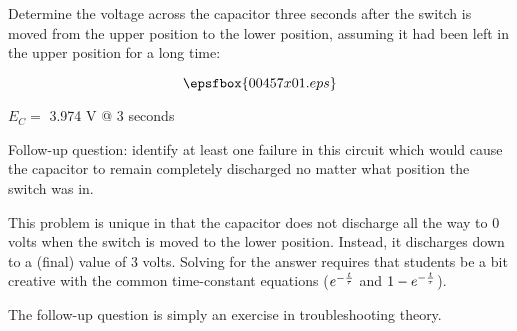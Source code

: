 

Determine the voltage across the capacitor three seconds after the switch is moved from the upper position to the lower position, assuming it had been left in the upper position for a long time:

$$\epsfbox{00457x01.eps}$$







$E_C =$ 3.974 V @ 3 seconds

\vskip 10pt

Follow-up question: identify at least one failure in this circuit which would cause the capacitor to remain completely discharged no matter what position the switch was in.







This problem is unique in that the capacitor does not discharge all the way to 0 volts when the switch is moved to the lower position.  Instead, it discharges down to a (final) value of 3 volts.  Solving for the answer requires that students be a bit creative with the common time-constant equations ($e^{-{t \over \tau}}$ and $1 - e^{-{t \over \tau}}$).

The follow-up question is simply an exercise in troubleshooting theory.




